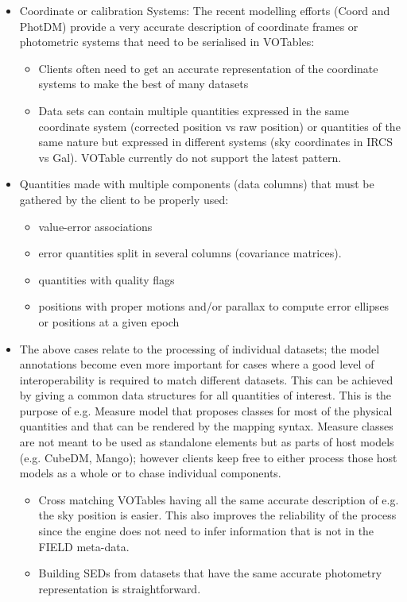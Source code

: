 \begin{itemize}
  \item Coordinate or calibration Systems: The recent modelling efforts (Coord and PhotDM) provide a very accurate description of coordinate frames or photometric systems that need to be serialised in VOTables:
  \begin{itemize}
    \item Clients often need to get an accurate representation of the coordinate systems to make the best of many datasets  
    \item Data sets can contain multiple quantities expressed in the same coordinate system (corrected position vs raw position) or 
             quantities of the same nature but expressed in different systems (sky coordinates in IRCS vs Gal). VOTable currently do not support the latest pattern.
  \end{itemize} 
  
  \item Quantities made with multiple components (data columns) that must be gathered by the client to be properly used:
  \begin{itemize}
    \item value-error associations
    \item error quantities split in several columns (covariance matrices). 
    \item quantities with quality flags
    \item positions with proper motions and/or parallax to compute error ellipses or positions at a given epoch
  \end{itemize} 

  \item The above cases relate to the processing of individual datasets; the model annotations become even more important for cases where a good level of interoperability is required to match different datasets. 
           This can be achieved by giving a common data structures for all quantities of interest. This is the purpose of e.g. Measure model that proposes classes for 
           most of the physical quantities and that can be rendered by the mapping syntax. Measure classes are not meant to be used as standalone elements but as parts of host models (e.g. CubeDM, Mango);
           however clients keep free to either process those host models as a whole or to chase individual components.
    \begin{itemize}
      \item Cross matching VOTables having all the same accurate description of e.g. the sky position is easier. 
               This also improves the reliability of the process since the engine does not need to infer information that is not in the FIELD meta-data.
      \item Building SEDs from datasets that have the same accurate photometry representation is straightforward.
   \end{itemize}          


\end{itemize}
